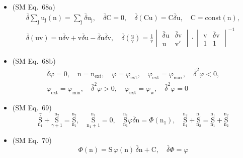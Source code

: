 \documentclass[
    12pt,              %
    a4paper,           %
    headings=normal,   %
    twoside=true,      %
    BCOR=8mm,          %
]{scrbook}
\begin{document}
\begin{itemize}[label={},leftmargin=0pt]
    \item (SM Eq.\ 68a) 
    \[
    \begin{gathered}
    \bar{\delta} \sum_\mathrm{j} \mathrm{u_j}(\mathrm{n}) = \sum_\mathrm{j} \bar{\delta} \mathrm{u_j}, \quad \bar{\delta}\mathrm{C} = 0, \quad \bar{\delta}(\mathrm{Cu}) = \mathrm{C}\bar{\delta}\mathrm{u}, \quad \mathrm{C} = \mathrm{const}(\mathrm{n}), \\
    \bar{\delta}(\mathrm{uv}) = \mathrm{u}\bar{\delta}\mathrm{v} + \mathrm{v}\bar{\delta}\mathrm{u} - \bar{\delta}\mathrm{u}\bar{\delta}\mathrm{v}, \quad \bar{\delta}\left( \frac{\mathrm{u}}{\mathrm{v}} \right) = \frac{1}{\mathrm{v}} \begin{vmatrix} \bar{\delta}\mathrm{u} & \bar{\delta}\mathrm{v} \\ \mathrm{u} & \mathrm{v}' \end{vmatrix} \cdot \begin{vmatrix} \mathrm{v} & \bar{\delta}\mathrm{v} \\ 1 & 1 \end{vmatrix}^{-1}
    \end{gathered}
    \]

    \item (SM Eq.\ 68b) 
    \[
    \begin{gathered}
    \bar{\delta}\varphi = 0, \quad \mathrm{n} = \mathrm{n}_{\mathrm{ext}}, \quad \varphi = \varphi_{\mathrm{ext}}, \quad \varphi_{\mathrm{ext}} = \varphi_{\max}, \quad \bar{\delta}^2\varphi < 0, \\
    \varphi_{\mathrm{ext}} = \varphi_{\min}, \quad \bar{\delta}^2\varphi > 0, \quad \varphi_{\mathrm{ext}} = \varphi_\mathrm{w}, \quad \bar{\delta}^2\varphi = 0
    \end{gathered}
    \]

    \item (SM Eq.\ 69) 
    \[
    \underset{\mathrm{n}_1}{\overset{\gamma}{\mathrm{S}}} + \underset{\gamma+1}{\overset{\mathrm{n}_2}{\mathrm{S}}} = \underset{\mathrm{n}_1}{\overset{\mathrm{n}_2}{\mathrm{S}}}, \quad \underset{\mathrm{n}_1+1}{\overset{\mathrm{n}_1}{\mathrm{S}}} = 0, \quad \underset{\mathrm{n}_1}{\overset{\mathrm{n}_1}{\mathrm{S}}} \varphi \bar{\delta}\mathrm{n} = \Phi(\mathrm{n}_1), \quad \underset{\mathrm{n}_1}{\overset{\mathrm{n}_2}{\mathrm{S}}} + \underset{\mathrm{n}_2}{\overset{\mathrm{n}_1}{\mathrm{S}}} = \underset{\mathrm{n}_1}{\overset{\mathrm{n}_1}{\mathrm{S}}} + \underset{\mathrm{n}_2}{\overset{\mathrm{n}_2}{\mathrm{S}}}
    \]

    \item (SM Eq.\ 70) 
    \[
    \Phi(\mathrm{n}) = \mathrm{S}\,\varphi(\mathrm{n})\,\bar{\delta}\mathrm{n} + \mathrm{C}, \quad \bar{\delta}\Phi = \varphi
    \]


\end{itemize}
\end{document}

